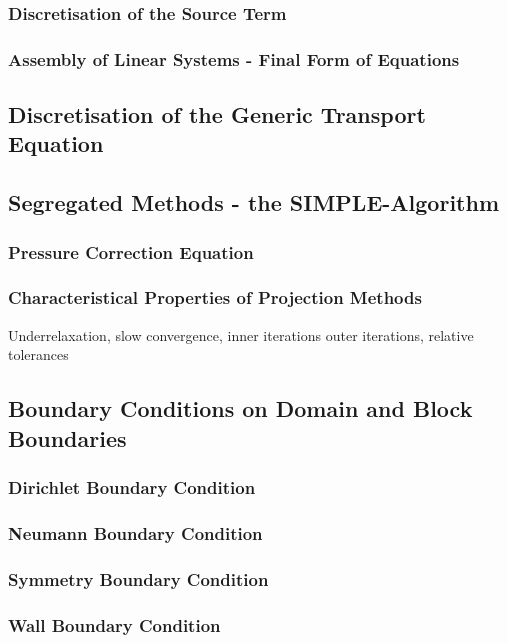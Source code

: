 \documentclass[article,type=msc,colorback,accentcolor=tud2a]{tudthesis}
\begin{document}
      \subsubsection{Discretisation of the Source Term}
      \subsubsection{Assembly of Linear Systems - Final Form of Equations}

    \subsection{Discretisation of the Generic Transport Equation}

    \subsection{Segregated Methods - the SIMPLE-Algorithm}
      
      \subsubsection{Pressure Correction Equation}
      \subsubsection{Characteristical Properties of Projection Methods}

        Underrelaxation, slow convergence, inner iterations outer iterations, relative tolerances
    \subsection{Boundary Conditions on Domain and Block Boundaries}
      
      \subsubsection{Dirichlet Boundary Condition}
      \subsubsection{Neumann Boundary Condition}
      \subsubsection{Symmetry Boundary Condition}
      \subsubsection{Wall Boundary Condition}
\end{document}
